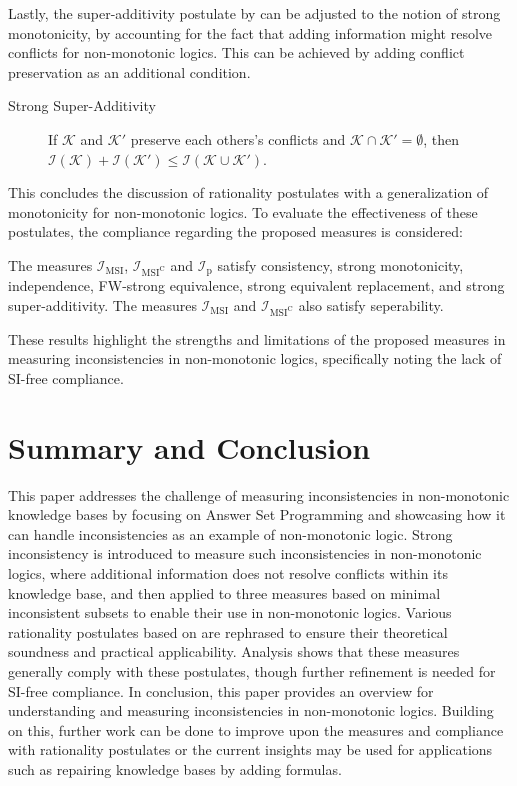 Lastly, the super-additivity postulate by \cite{thimm_measuring_2009} can be adjusted to the notion of strong monotonicity, by accounting for the fact that adding information might resolve conflicts for non-monotonic logics. This can be achieved by adding conflict preservation as an additional condition.

\begin{description}
    \item[Strong Super-Additivity] If \(\mathcal{K}\) and \(\mathcal{K}'\) preserve each others's conflicts and \(\mathcal{K} \cap \mathcal{K}' = \emptyset\), then \(\mathcal{I}(\mathcal{K}) + \mathcal{I}(\mathcal{K}') \leq \mathcal{I}(\mathcal{K} \cup \mathcal{K}')\).
\end{description}

This concludes the discussion of rationality postulates with a generalization of monotonicity for non-monotonic logics. To evaluate the effectiveness of these postulates, the compliance regarding the proposed measures is considered:

\begin{proposition}
    The measures \(\mathcal{I}_{\text{MSI}}\), \(\mathcal{I}_{\text{MSI}^\text{C}}\) and \(\mathcal{I}_{\text{p}}\) satisfy consistency, strong monotonicity, independence, FW-strong equivalence, strong equivalent replacement, and strong super-additivity. The measures \(\mathcal{I}_{\text{MSI}}\) and \(\mathcal{I}_{\text{MSI}^\text{C}}\) also satisfy seperability.
\end{proposition}

These results highlight the strengths and limitations of the proposed measures in measuring inconsistencies in non-monotonic logics, specifically noting the lack of SI-free compliance.

\section{Summary and Conclusion}
This paper addresses the challenge of measuring inconsistencies in non-monotonic knowledge bases by focusing on Answer Set Programming and showcasing how it can handle inconsistencies as an example of non-monotonic logic. Strong inconsistency is introduced to measure such inconsistencies in non-monotonic logics, where additional information does not resolve conflicts within its knowledge base, and then applied to three measures based on minimal inconsistent subsets to enable their use in non-monotonic logics. Various rationality postulates based on \cite{hunter_measure_2010} are rephrased to ensure their theoretical soundness and practical applicability. Analysis shows that these measures generally comply with these postulates, though further refinement is needed for SI-free compliance. In conclusion, this paper provides an overview for understanding and measuring inconsistencies in non-monotonic logics. Building on this, further work can be done to improve upon the measures and compliance with rationality postulates or the current insights may be used for applications such as repairing knowledge bases by adding formulas.